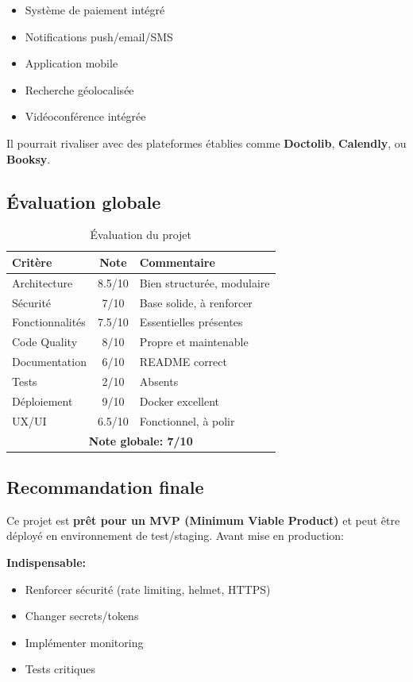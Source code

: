 \documentclass[12pt,a4paper]{article}
\begin{document}
\begin{itemize}
    \item Système de paiement intégré
    \item Notifications push/email/SMS
    \item Application mobile
    \item Recherche géolocalisée
    \item Vidéoconférence intégrée
\end{itemize}

Il pourrait rivaliser avec des plateformes établies comme \textbf{Doctolib}, \textbf{Calendly}, ou \textbf{Booksy}.

\subsection{Évaluation globale}

\begin{table}[h]
\centering
\begin{tabular}{|l|c|p{5cm}|}
\hline
\textbf{Critère} & \textbf{Note} & \textbf{Commentaire} \\
\hline
Architecture & 8.5/10 & Bien structurée, modulaire \\
Sécurité & 7/10 & Base solide, à renforcer \\
Fonctionnalités & 7.5/10 & Essentielles présentes \\
Code Quality & 8/10 & Propre et maintenable \\
Documentation & 6/10 & README correct \\
Tests & 2/10 & Absents \\
Déploiement & 9/10 & Docker excellent \\
UX/UI & 6.5/10 & Fonctionnel, à polir \\
\hline
\multicolumn{3}{|c|}{\textbf{Note globale: 7/10}} \\
\hline
\end{tabular}
\caption{Évaluation du projet}
\end{table}

\subsection{Recommandation finale}

Ce projet est \textbf{prêt pour un MVP (Minimum Viable Product)} et peut être déployé en environnement de test/staging. Avant mise en production:

\textbf{Indispensable:}
\begin{itemize}
    \item[\checkmark] Renforcer sécurité (rate limiting, helmet, HTTPS)
    \item[\checkmark] Changer secrets/tokens
    \item[\checkmark] Implémenter monitoring
    \item[\checkmark] Tests critiques
\end{itemize}
\end{document}
